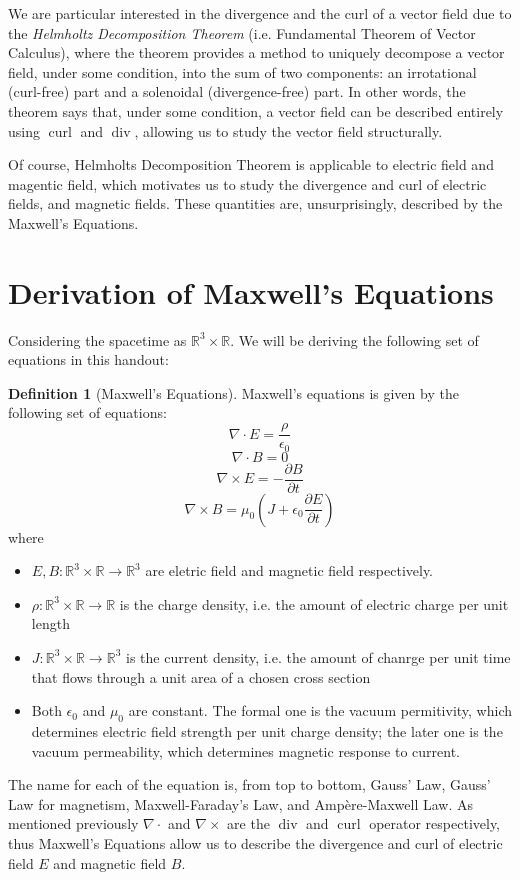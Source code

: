 \documentclass{article}
\theoremstyle{definition}
\newtheorem{defn}[thm]{Definition}
\newcommand{\R}{{\mathbb R}}
\newcommand{\curl}{\operatorname{curl}}
\renewcommand{\div}{\operatorname{div}}
\newcommand{\br}[1]{\left(#1\right)}
\begin{document}
We are particular interested in the divergence and the curl of a vector field due to the \textit{Helmholtz Decomposition Theorem} (i.e. Fundamental Theorem of Vector Calculus), where the theorem provides a method to uniquely decompose a vector field, under some condition, into the sum of two components: an irrotational (curl-free) part and a solenoidal (divergence-free) part. In other words, the theorem says that, under some condition, a vector field can be described entirely using $\curl$ and $\div$, allowing us to study the vector field structurally.

Of course, Helmholts Decomposition Theorem is applicable to electric field and magentic field, which motivates us to study the divergence and curl of electric fields, and magnetic fields. These quantities are, unsurprisingly, described by the Maxwell's Equations.

\section{Derivation of Maxwell's Equations}

Considering the spacetime as $\R^3\times \R$. We will be deriving the following set of equations in this handout:

\medskip

\begin{defn} [Maxwell's Equations]
    Maxwell's equations is given by the following set of equations:
    \[\nabla\cdot E = \frac{\rho}{\epsilon_0}\]
    \[\nabla\cdot B = 0\]
    \[\nabla\times E = -\frac{\partial B}{\partial t}\]
    \[\nabla\times B = \mu_0 \br{J + \epsilon_0\frac{\partial E}{\partial t}}\]
    where \begin{itemize}
        \item $E, B:\R^3\times \R \to \R^3$ are eletric field and magnetic field respectively. 
        \item $\rho:\R^3\times \R \to \R$ is the charge density, i.e. the amount of electric charge per unit length
        \item $J: \R^3 \times \R\to \R^3$ is the current density, i.e. the amount of chanrge per unit time that flows through a unit area of a chosen cross section
        \item Both $\epsilon_0$ and $\mu_0$ are constant. The formal one is the vacuum permitivity, which determines electric field strength per unit charge density; the later one is the vacuum permeability, which determines magnetic response to current.
    \end{itemize}
\end{defn}
The name for each of the equation is, from top to bottom, Gauss' Law, Gauss' Law for magnetism, Maxwell-Faraday's Law, and Ampère-Maxwell Law. As mentioned previously $\nabla\cdot$ and $\nabla \times$ are the $\div$ and $\curl$ operator respectively, thus Maxwell's Equations allow us to describe the divergence and curl of electric field $E$ and magnetic field $B$.
\end{document}
